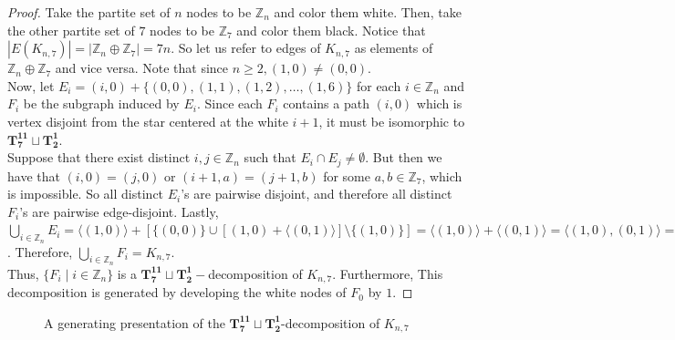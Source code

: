 \documentclass{dmgt}
\newcommand{\ZZ}{\ensuremath{\mathbb{Z}}} %
\begin{document}
\begin{proof}
    Take the partite set of $n$ nodes to be $\ZZ_{n}$ and color them white. Then, take the other partite set of $7$ nodes to be $\ZZ_{7}$ and color them black. Notice that $|E(K_{n,7})|=|\ZZ_{n}\oplus \ZZ_{7}|=7n$. So let us refer to edges of $K_{n,7}$ as elements of $\ZZ_{n}\oplus \ZZ_{7}$ and vice versa. Note that since $n\geq 2, (1,0)\neq (0,0)$.
    \\
    
    \noindent Now, let $E_{i}= (i,0)+\{(0,0),(1,1),(1,2),\hdots,(1,6)\}$ for each $i\in \ZZ_{n}$ and $F_{i}$ be the subgraph induced by $E_{i}$. Since each $F_{i}$ contains a path $(i,0)$ which is vertex disjoint from the star centered at the white $i+1$, it must be isomorphic to $\mathbf{T_{7}^{11}}\sqcup\mathbf{T_{2}^{1}}$.
    \\

    
    \noindent Suppose that there exist distinct $i,j\in \ZZ_{n}$ such that $E_{i}\cap E_{j}\neq \emptyset$. But then we have that $(i,0)=(j,0)$ or $(i+1,a)=(j+1,b)$ for some $a,b\in \ZZ_{7}$, which is impossible. So all distinct $E_{i}$'s are pairwise disjoint, and therefore all distinct $F_{i}$'s are pairwise edge-disjoint. Lastly, $\bigcup_{i\in \ZZ_{n}} E_{i}=\langle (1,0)\rangle + [\{(0,0)\}\cup [(1,0)+\langle (0,1)\rangle] \setminus \{(1,0)\}]=\langle (1,0)\rangle + \langle (0,1)\rangle = \langle (1,0),(0,1)\rangle = \ZZ_{n}\oplus \ZZ_{7}$. Therefore, $\bigcup_{i\in \ZZ_{n}} F_{i} = K_{n,7}$. 
    \\
    
    \noindent Thus, $\{F_{i}\mid i\in \ZZ_{n}\}$ is a $\mathbf{T_{7}^{11}}\sqcup\mathbf{T_{2}^{1}}-$decomposition of $K_{n,7}$. Furthermore, This decomposition is generated by developing the white nodes of $F_{0}$ by $1$.
\end{proof}
\newpage
\begin{figure}
    \centering
    
    \caption{A generating presentation of the $\mathbf{T_{7}^{11}}\sqcup\mathbf{T_{2}^{1}}$-decomposition of $K_{n,7}$}
    \label{fig:enter-label}
\end{figure}
\end{document}
